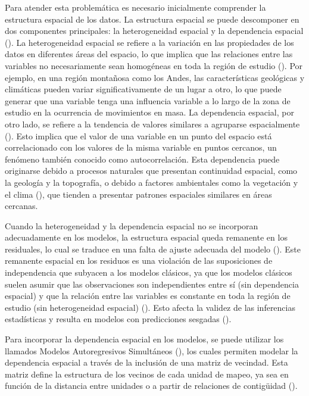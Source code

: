 \documentclass[
  manuscript=article,  
  layout=preprint,  
  year=2023,
  volume=0,
]{format}
\begin{document}
Para atender esta problemática es necesario inicialmente comprender la estructura espacial de los datos. La estructura espacial se puede descomponer en dos componentes principales: la heterogeneidad espacial y la dependencia espacial (\cite{anselin1996simple, rey2023geographic}). La heterogeneidad espacial se refiere a la variación en las propiedades de los datos en diferentes áreas del espacio, lo que implica que las relaciones entre las variables no necesariamente sean homogéneas en toda la región de estudio (\cite{rey2023geographic}). Por ejemplo, en una región montañosa como los Andes, las características geológicas y climáticas pueden variar significativamente de un lugar a otro, lo que puede generar que una variable tenga una influencia variable a lo largo de la zona de estudio en la ocurrencia de movimientos en masa. La dependencia espacial, por otro lado, se refiere a la tendencia de valores similares a agruparse espacialmente (\cite{anselin1988spatial}). Esto implica que el valor de una variable en un punto del espacio está correlacionado con los valores de la misma variable en puntos cercanos, un fenómeno también conocido como autocorrelación. Esta dependencia puede originarse debido a procesos naturales que presentan continuidad espacial, como la geología y la topografía, o debido a factores ambientales como la vegetación y el clima (\cite{samia2019dynamic, lombardo2020space}), que tienden a presentar patrones espaciales similares en áreas cercanas.

Cuando la heterogeneidad y la dependencia espacial no se incorporan adecuadamente en los modelos, la estructura espacial queda remanente en los residuales, lo cual se traduce en una falta de ajuste adecuada del modelo (\cite{anselin2022spatial, cressie2015statistics, }). Este remanente espacial en los residuos es una violación de las suposiciones de independencia que subyacen a los modelos clásicos, ya que los modelos clásicos suelen asumir que las observaciones son independientes entre sí (sin dependencia espacial) y que la relación entre las variables es constante en toda la región de estudio (sin heterogeneidad espacial) (\cite{lesage2011pitfalls, banerjee2008gaussian}). Esto afecta la validez de las inferencias estadísticas y resulta en modelos con predicciones sesgadas (\cite{cressie1988spatial}). 

Para incorporar la dependencia espacial en los modelos, se puede utilizar los llamados Modelos Autoregresivos Simultáneos (\cite{whittle1954stationary}), los cuales permiten modelar la dependencia espacial a través de la inclusión de una matriz de vecindad. Esta matriz define la estructura de los vecinos de cada unidad de mapeo, ya sea en función de la distancia entre unidades o a partir de relaciones de contigüidad (\cite{anselin1996simple, elhorst2014spatial}).
\end{document}
